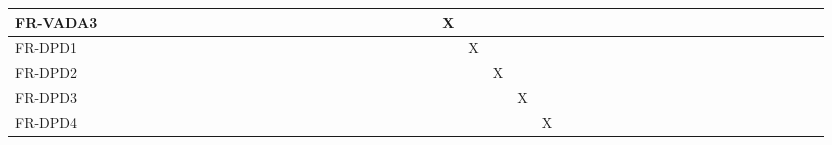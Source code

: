 \documentclass[12pt, titlepage]{article}
\begin{document}
\begin{landscape}
\begin{table}[!ht]
{\begin{tabular}{|l|l|l|l|l|l|l|l|l|l|l|l|l|l|l|l|l|l|l|l|l|l|l|l|l|l|l|l|l|l|l|l|l|}
        FR-VADA3 & ~ & ~ & ~ & ~ & ~ & ~ & ~ & ~ & ~ & ~ & ~ & ~ & ~ & ~ & ~ & X & ~ & ~ & ~ & ~ & ~ & ~ & ~ & ~ & ~ & ~ & ~ & ~ & ~ & ~ & ~ & ~ \\ \hline
        FR-DPD1 & ~ & ~ & ~ & ~ & ~ & ~ & ~ & ~ & ~ & ~ & ~ & ~ & ~ & ~ & ~ & ~ & X & ~ & ~ & ~ & ~ & ~ & ~ & ~ & ~ & ~ & ~ & ~ & ~ & ~ & ~ & ~ \\ \hline
        FR-DPD2 & ~ & ~ & ~ & ~ & ~ & ~ & ~ & ~ & ~ & ~ & ~ & ~ & ~ & ~ & ~ & ~ & ~ & X & ~ & ~ & ~ & ~ & ~ & ~ & ~ & ~ & ~ & ~ & ~ & ~ & ~ & ~ \\ \hline
        FR-DPD3 & ~ & ~ & ~ & ~ & ~ & ~ & ~ & ~ & ~ & ~ & ~ & ~ & ~ & ~ & ~ & ~ & ~ & ~ & X & ~ & ~ & ~ & ~ & ~ & ~ & ~ & ~ & ~ & ~ & ~ & ~ & ~ \\ \hline
        FR-DPD4 & ~ & ~ & ~ & ~ & ~ & ~ & ~ & ~ & ~ & ~ & ~ & ~ & ~ & ~ & ~ & ~ & ~ & ~ & ~ & X & ~ & ~ & ~ & ~ & ~ & ~ & ~ & ~ & ~ & ~ & ~ & ~ \\ \hline
    \end{tabular}
    }
\end{table}


\end{landscape}
\end{document}
